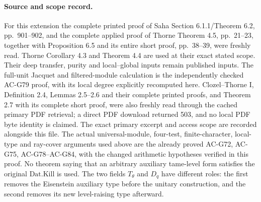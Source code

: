 \paragraph{Source and scope record.}
For this extension the complete printed proof of Saha
Section 6.1.1/Theorem 6.2, pp.~901--902, and the complete
applied proof of Thorne Theorem 4.5, pp.~21--23, together
with Proposition 6.5 and its entire short proof, pp.~38--39,
were freshly read.  Thorne Corollary 4.3 and Theorem 4.4
are used at their exact stated scope.  Their deep transfer,
purity and local--global inputs remain published inputs.
The full-unit Jacquet and filtered-module calculation is
the independently checked AC-G79 proof, with its local
degree explicitly recomputed here.  Clozel--Thorne I,
Definition 2.4, Lemmas 2.5--2.6 and their complete printed
proofs, and Theorem 2.7 with its complete short proof,
were also freshly read through the cached primary PDF
retrieval; a direct PDF download returned 503, and no
local PDF byte identity is claimed.  The exact primary
excerpt and access scope are recorded alongside this file.
The actual universal-module, four-test, finite-character,
local-type and ray-cover arguments used above are the
already proved AC-G72, AC-G75, AC-G78--AC-G84, with the
changed arithmetic hypotheses verified in this proof.
No theorem saying that an arbitrary auxiliary tame-level
form satisfies the original $\mathrm{Dat.Kill}$ is used.
The two fields $T_\theta$ and $D_q$ have different roles:
the first removes the Eisenstein auxiliary type before
the unitary construction, and the second removes its
new level-raising type afterward.
